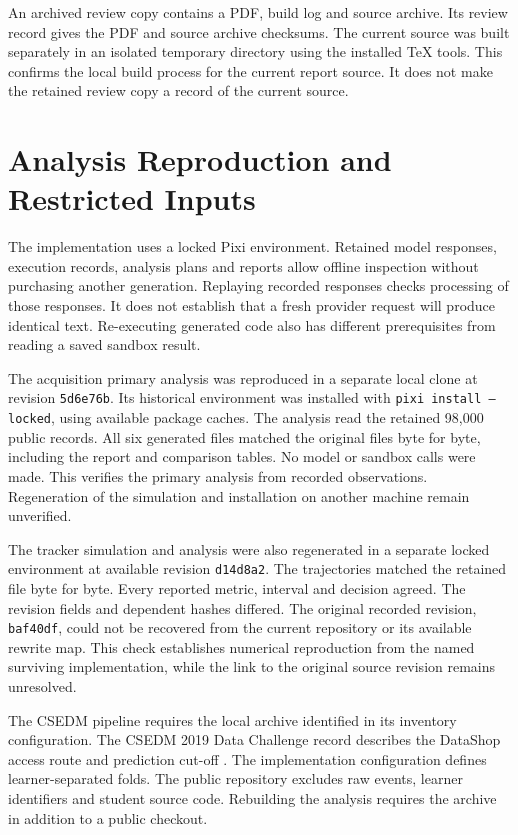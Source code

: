An archived review copy contains a PDF, build log and source archive. Its review record gives the PDF and source archive
checksums. The current source was built
separately in an isolated temporary directory using the installed TeX tools. This confirms the local build process for the
current report source. It does not make the retained review copy a record of the current source.

\section{Analysis Reproduction and Restricted Inputs}

The implementation uses a locked Pixi environment. Retained model responses, execution records, analysis plans and reports
allow offline inspection without purchasing another generation. Replaying recorded responses checks processing of those
responses. It does not establish that a fresh provider request will produce identical text. Re-executing generated code also
has different prerequisites from reading a saved sandbox result.

The acquisition primary analysis was reproduced in a separate local clone at revision
\texttt{5d6e76b}. Its historical environment was installed with \texttt{pixi install --locked}, using available package
caches. The analysis read the retained 98,000 public records. All six generated files matched the original files byte for
byte, including the report and comparison tables. No model or sandbox calls were made. This verifies the primary analysis
from recorded observations. Regeneration of the simulation and installation on another machine remain unverified.

The tracker simulation and analysis were also regenerated in a separate locked environment at available revision
\texttt{d14d8a2}. The trajectories matched the retained file byte for byte. Every reported metric, interval and decision
agreed. The revision fields and dependent hashes differed. The original recorded revision, \texttt{baf40df}, could not be
recovered from the current repository or its available rewrite map. This check establishes numerical reproduction from
the named surviving implementation, while the link to the original source revision remains unresolved.

The CSEDM pipeline requires the local archive identified in its inventory configuration. The CSEDM 2019 Data Challenge
record describes the DataShop access route and prediction cut-off \parencite{csedm2019challenge}. The implementation
configuration defines learner-separated folds.
The public repository excludes raw events, learner identifiers and student source code. Rebuilding the analysis requires the
archive in addition to a public checkout.

